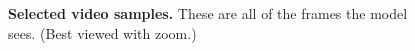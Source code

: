 \begin{figure}[!t]
\centering
\caption{\small \textbf{Selected video samples.}
These are all of the frames the model sees.
(Best viewed with zoom.)}
\label{fig:videoexamples}
\end{figure}
